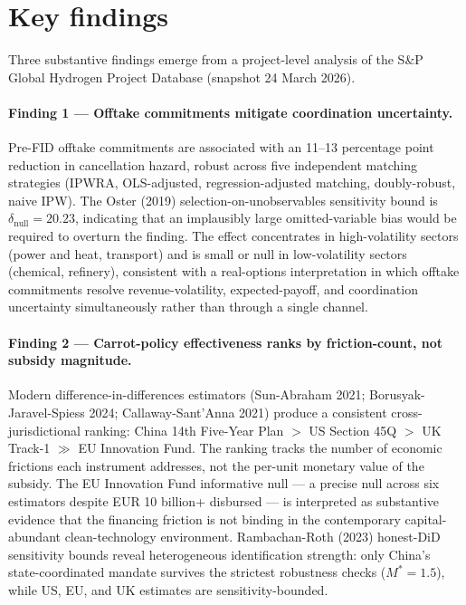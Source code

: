 \documentclass[11pt,a4paper]{article}
\begin{document}
\section*{Key findings}

Three substantive findings emerge from a project-level analysis of the S\&P Global Hydrogen Project Database (snapshot 24 March 2026).

\paragraph{Finding 1 --- Offtake commitments mitigate coordination uncertainty.} Pre-FID offtake commitments are associated with an 11--13 percentage point reduction in cancellation hazard, robust across five independent matching strategies (IPWRA, OLS-adjusted, regression-adjusted matching, doubly-robust, naive IPW). The Oster (2019) selection-on-unobservables sensitivity bound is $\delta_{\text{null}} = 20.23$, indicating that an implausibly large omitted-variable bias would be required to overturn the finding. The effect concentrates in high-volatility sectors (power and heat, transport) and is small or null in low-volatility sectors (chemical, refinery), consistent with a real-options interpretation in which offtake commitments resolve revenue-volatility, expected-payoff, and coordination uncertainty simultaneously rather than through a single channel.

\paragraph{Finding 2 --- Carrot-policy effectiveness ranks by friction-count, not subsidy magnitude.} Modern difference-in-differences estimators (Sun-Abraham 2021; Borusyak-Jaravel-Spiess 2024; Callaway-Sant'Anna 2021) produce a consistent cross-jurisdictional ranking: China 14th Five-Year Plan $>$ US Section 45Q $>$ UK Track-1 $\gg$ EU Innovation Fund. The ranking tracks the number of economic frictions each instrument addresses, not the per-unit monetary value of the subsidy. The EU Innovation Fund informative null --- a precise null across six estimators despite EUR 10 billion+ disbursed --- is interpreted as substantive evidence that the financing friction is not binding in the contemporary capital-abundant clean-technology environment. Rambachan-Roth (2023) honest-DiD sensitivity bounds reveal heterogeneous identification strength: only China's state-coordinated mandate survives the strictest robustness checks ($M^* = 1.5$), while US, EU, and UK estimates are sensitivity-bounded.
\end{document}
